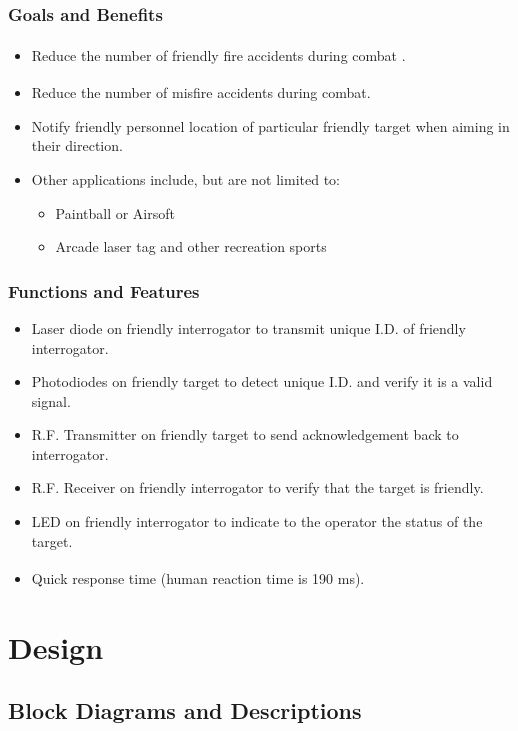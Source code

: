 \documentclass[letterpaper,10pt]{article}
\begin{document}
\begin{spacing}{1.15}
\subsubsection{Goals and Benefits}
\begin{itemize}
	\item Reduce the number of friendly fire accidents during combat \textsuperscript{\cite{Garrison}}.
	\item Reduce the number of misfire accidents during combat\textsuperscript{\cite{Garrison}}.
	\item Notify friendly personnel location of particular friendly target when aiming in their direction.
	\item Other applications include, but are not limited to:
	\begin{itemize}
		\item Paintball or Airsoft
		\item Arcade laser tag and other recreation sports
	\end{itemize}
\end{itemize}
\subsubsection{Functions and Features}
\begin{itemize}
	\item Laser diode on friendly interrogator to transmit unique I.D. of friendly interrogator.
	\item Photodiodes on friendly target to detect unique I.D. and verify it is a valid signal.
	\item R.F. Transmitter on friendly target to send acknowledgement back to interrogator.
	\item R.F. Receiver on friendly interrogator to verify that the target is friendly.
	\item LED on friendly interrogator to indicate to the operator the status of the target.
	\item Quick response time (human reaction time is 190 ms\textsuperscript{\cite{Reaction_Times}}).
\end{itemize}
\clearpage

\section{Design}
\subsection{Block Diagrams and Descriptions}

\end{spacing}
\end{document}
